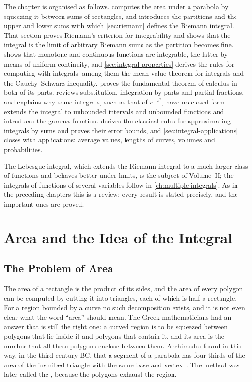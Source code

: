 The chapter is organised as follows.  computes the area under a parabola by squeezing it between sums of rectangles, and introduces the partitions and the upper and lower sums with which \cref{sec:riemann} defines the Riemann integral. That section proves Riemann's criterion for integrability and shows that the integral is the limit of arbitrary Riemann sums as the partition becomes fine.  shows that monotone and continuous functions are integrable, the latter by means of uniform continuity, and \cref{sec:integral-properties} derives the rules for computing with integrals, among them the mean value theorem for integrals and the Cauchy--Schwarz inequality.  proves the fundamental theorem of calculus in both of its parts.  reviews substitution, integration by parts and partial fractions, and explains why some integrals, such as that of $e^{-x^2}$, have no closed form.  extends the integral to unbounded intervals and unbounded functions and introduces the gamma function.  derives the classical rules for approximating integrals by sums and proves their error bounds, and \cref{sec:integral-applications} closes with applications: average values, lengths of curves, volumes and probabilities.

The Lebesgue integral, which extends the Riemann integral to a much larger class of functions and behaves better under limits, is the subject of Volume~II; the integrals of functions of several variables follow in \cref{ch:multiple-integrals}. As in the preceding chapters this is a review: every result is stated precisely, and the important ones are proved.

\section{Area and the Idea of the Integral}
\label{sec:area}

\subsection{The Problem of Area}

The area of a rectangle is the product of its sides, and the area of every polygon can be computed by cutting it into triangles, each of which is half a rectangle. For a region bounded by a curve no such decomposition exists, and it is not even clear what the word ``area'' should mean. The Greek mathematicians had an answer that is still the right one: a curved region is to be squeezed between polygons that lie inside it and polygons that contain it, and its area is the number that all these polygons enclose between them. Archimedes found in this way, in the third century BC, that a segment of a parabola has four thirds of the area of the inscribed triangle with the same base and vertex~\cite{heath1897archimedes,edwards1979}. The method was later called the , because the polygons exhaust the region.

